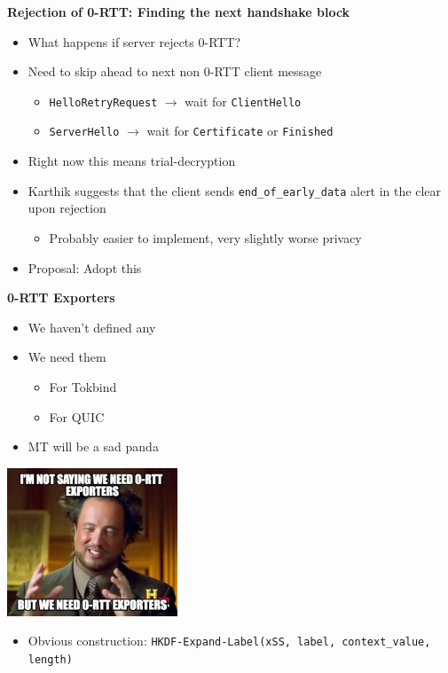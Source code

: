\documentclass[helvetica]{seminar}
\newcommand{\heading}[1]{%
  \begin{center} 
    \large\bf 
    #1 
  \end{center} 
  \vspace{.4 in}}
\begin{document}
\begin{slide}
\heading{Rejection of 0-RTT: Finding the next handshake block}

\begin{itemize}
\item What happens if server rejects 0-RTT?
\item Need to skip ahead to next non 0-RTT client message
  \begin{itemize}
  \item \verb^HelloRetryRequest^ $\rightarrow$ wait for \verb^ClientHello^
  \item \verb^ServerHello^ $\rightarrow$ wait for \verb^Certificate^ or \verb^Finished^
  \end{itemize}
  
\item Right now this means trial-decryption
\item Karthik suggests that the client sends \verb^end_of_early_data^ alert in the clear upon rejection
  \begin{itemize}
  \item Probably easier to implement, very slightly worse privacy
  \end{itemize}

\item Proposal: Adopt this
\end{itemize}
\end{slide}


\begin{slide}
\heading{0-RTT Exporters}

\begin{minipage}{2in}
\begin{itemize}
\item We haven't defined any
\item We need them 
  \begin{itemize}
  \item For Tokbind
  \item For QUIC
  \end{itemize}
\item MT will be a sad panda
\end{itemize}
\end{minipage}
\begin{minipage}{2in}
\includegraphics[width=2in]{850509}
\end{minipage}

\begin{itemize}
\item Obvious construction: \verb^HKDF-Expand-Label(xSS, label, context_value, length)^
\end{itemize} 

\end{slide}
\end{document}
